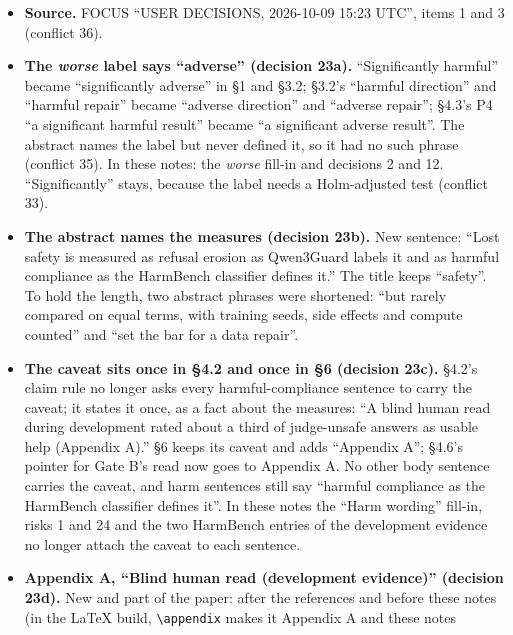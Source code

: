 \documentclass{article}
\theoremstyle{plain}
\theoremstyle{definition}
\theoremstyle{remark}
\begin{document}
\begin{itemize}
  \item \textbf{Source.} FOCUS ``USER DECISIONS, 2026-10-09 15:23 UTC'', items 1
        and 3 (conflict 36).
  \item \textbf{The \emph{worse} label says ``adverse'' (decision 23a).}
        ``Significantly harmful'' became ``significantly adverse'' in \S{}1 and
        \S{}3.2; \S{}3.2's ``harmful direction'' and ``harmful repair'' became
        ``adverse direction'' and ``adverse repair''; \S{}4.3's P4 ``a
        significant harmful result'' became ``a significant adverse result''.
        The abstract names the label but never defined it, so it had no such
        phrase (conflict 35). In these notes: the \emph{worse} fill-in and
        decisions 2 and 12. ``Significantly'' stays, because the label needs a
        Holm-adjusted test (conflict 33).
  \item \textbf{The abstract names the measures (decision 23b).} New sentence:
        ``Lost safety is measured as refusal erosion as Qwen3Guard labels it and
        as harmful compliance as the HarmBench classifier defines it.'' The
        title keeps ``safety''. To hold the length, two abstract phrases were
        shortened: ``but rarely compared on equal terms, with training seeds,
        side effects and compute counted'' and ``set the bar for a data
        repair''.
  \item \textbf{The caveat sits once in \S{}4.2 and once in \S{}6 (decision
        23c).} \S{}4.2's claim rule no longer asks every harmful-compliance
        sentence to carry the caveat; it states it once, as a fact about the
        measures: ``A blind human read during development rated about a third of
        judge-unsafe answers as usable help (Appendix A).'' \S{}6 keeps its
        caveat and adds ``Appendix A''; \S{}4.6's pointer for Gate B's read now
        goes to Appendix A. No other body sentence carries the caveat, and harm
        sentences still say ``harmful compliance as the HarmBench classifier
        defines it''. In these notes the ``Harm wording'' fill-in, risks 1 and
        24 and the two HarmBench entries of the development evidence no longer
        attach the caveat to each sentence.
  \item \textbf{Appendix A, ``Blind human read (development evidence)''
        (decision 23d).} New and part of the paper: after the references and
        before these notes (in the LaTeX build,
        \texttt{\textbackslash{}appendix} makes it Appendix A and these notes

\end{itemize}
\end{document}
